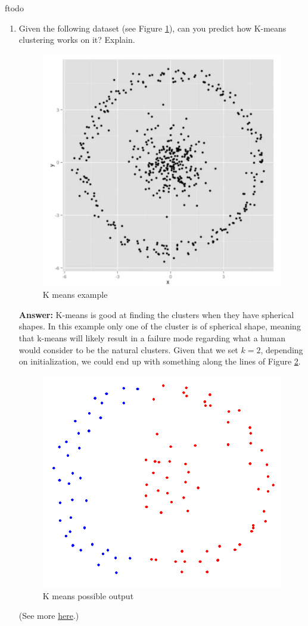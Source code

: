 ƒtodo\documentclass{article}
\newenvironment{QandA}{\begin{enumerate}[label=\arabic*.]}{\end{enumerate}}
\newenvironment{InnerQandA}{\begin{enumerate}[label=\roman*.]}{\end{enumerate}}
\newenvironment{answer}{\par\normalfont \textbf{Answer:}}{}
\begin{document}
\begin{QandA}
\begin{InnerQandA}
        \item Given the following dataset (see Figure \ref{fig:k-means-example}), can you predict how K-means clustering works on it? Explain.
        \begin{figure}[h!]
            \centering
            \includegraphics[width=0.4\columnwidth]{img/k-means-example.png}
            \caption{K means example}
            \label{fig:k-means-example}
        \end{figure}
        
        \begin{answer}
            K-means is good at finding the clusters when they have spherical shapes. In this example only one of the cluster is of spherical shape, meaning that k-means will likely result in a failure mode regarding what a human would consider to be the natural clusters. Given that we set $k=2$, depending on initialization, we could end up with something along the lines of Figure \ref{fig:k-means-possible-sol}.

            \begin{figure}[h!]
                \centering
                \includegraphics[width=0.4\columnwidth]{img/k-means-possible-sol.png}
                \caption{K means possible output}
                \label{fig:k-means-possible-sol}
            \end{figure}
            (See more \href{https://towardsdatascience.com/k-means-clustering-algorithm-applications-evaluation-methods-and-drawbacks-aa03e644b48a}{here}.)
        \end{answer}
    \end{InnerQandA}


\end{QandA}
\end{document}
